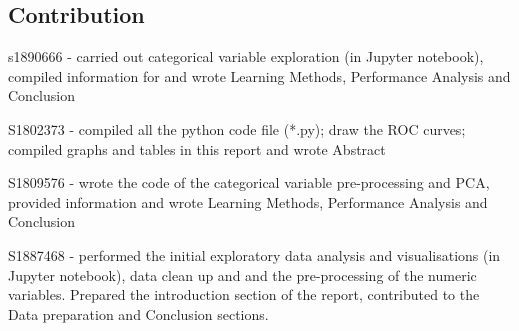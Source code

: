 \documentclass{article}
\begin{document}






\newpage

\appendixtitleon
\appendixtitletocon
\begin{appendices}
\section{Contribution}
s1890666 - carried out categorical variable exploration (in Jupyter notebook), compiled information for and wrote Learning Methods, Performance Analysis and Conclusion

S1802373 - compiled all the python code file (*.py); draw the ROC curves; compiled graphs and tables in this report and wrote Abstract

S1809576 - wrote the code of the categorical variable pre-processing and PCA, provided information and wrote Learning Methods, Performance Analysis and Conclusion

S1887468 - performed the initial exploratory data analysis and visualisations (in Jupyter notebook), data clean up and and the pre-processing of the numeric variables.
Prepared the introduction section of the report, contributed to the Data preparation and Conclusion sections.
\end{appendices}
\end{document}
